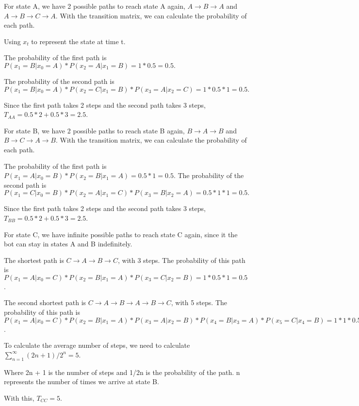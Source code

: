\documentclass{article}
\begin{document}
For state A, we have 2 possible paths to reach state A again, $A \rightarrow B \rightarrow A$ and 
$A \rightarrow B \rightarrow C \rightarrow A$. With the transition matrix, we can calculate the probability of each path.

\bigskip

Using $x_t$ to represent the state at time t. 

The probability of the first path is $P(x_1=B|x_0=A) * P(x_2=A|x_1=B) = 1 * 0.5 = 0.5.$

The probability of the second path is $P(x_1=B|x_0=A) * P(x_2=C|x_1=B) * P(x_3=A|x_2=C) = 1 * 0.5 * 1 = 0.5.$


Since the first path takes 2 steps and the second path takes 3 steps, 
$T_{AA} = 0.5 * 2 + 0.5 * 3 = 2.5$.

For state B, we have 2 possible paths to reach state B again, $B \rightarrow A \rightarrow B$ and
$B \rightarrow C \rightarrow A \rightarrow B$. With the transition matrix, we can calculate the probability of each path.

The probability of the first path is $P(x_1=A|x_0=B) * P(x_2=B|x_1=A) = 0.5 * 1 = 0.5.$
The probability of the second path is $P(x_1=C|x_0=B) * P(x_2=A|x_1=C) * P(x_3=B|x_2=A) = 0.5 * 1 * 1 = 0.5.$

Since the first path takes 2 steps and the second path takes 3 steps,
$T_{BB} = 0.5 * 2 + 0.5 * 3 = 2.5$.

For state C, we have infinite possible paths to reach state C again, since it the bot can stay in states A and B indefinitely.

The shortest path is $C \rightarrow A \rightarrow B \rightarrow C$, with 3 steps.
The probability of this path is $P(x_1=A|x_0=C) * P(x_2=B|x_1=A) * P(x_3=C|x_2=B) = 1 * 0.5 * 1 = 0.5$.

The second shortest path is $C \rightarrow A \rightarrow B \rightarrow A \rightarrow B \rightarrow C$, with 5 steps.
The probability of this path is $P(x_1=A|x_0=C) * P(x_2=B|x_1=A) * P(x_3=A|x_2=B) * P(x_4=B|x_3=A) * P(x_5=C|x_4=B) 
= 1 * 1 * 0.5 * 1 * 0.5 = 0.25$.


To calculate the average number of steps, we need to calculate $\sum_{n=1}^{\infty} (2n + 1) / 2^n = 5$. %

Where 2n + 1 is the number of steps and 1/2n is the probability of the path. n represents the number of times we arrive at 
state B.

With this, $T_{CC} = 5$.
\end{document}
